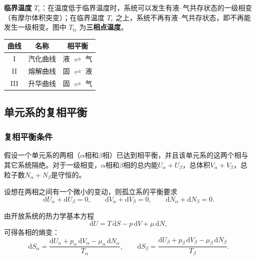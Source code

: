 \documentclass[UTF8]{ctexart}
\theoremstyle{definition}
\begin{document}
\textbf{临界温度} $T_c$：在温度低于临界温度时，系统可以发生有液--气共存状态的一级相变（有摩尔体积突变）；在临界温度 $T_c$ 之上，系统不再有液--气共存状态，即不再能发生一级相变。图中 $T_{\mathrm{tr}}$ 为\textbf{三相点温度}。

\begin{center}
\begin{tabular}{c|c|c}
\hline
曲线 & 名称 & 相平衡 \\
\hline
I & 汽化曲线 & 液 $\rightleftharpoons$ 气 \\
II & 熔解曲线 & 固 $\rightleftharpoons$ 液 \\
III & 升华曲线 & 固 $\rightleftharpoons$ 气 \\
\hline
\end{tabular}
\end{center}

\subsection{单元系的复相平衡}

\subsubsection*{复相平衡条件}

假设一个单元系的两相（$\alpha$相和$\beta$相）已达到相平衡，并且该单元系的这两个相与其它系统隔绝。对于一级相变，$\alpha$相和$\beta$相的总内能$U_\alpha+U_\beta$，总体积$V_\alpha+V_\beta$，总粒子数$N_\alpha+N_\beta$是守恒的。

设想在两相之间有一个微小的变动，则孤立系的平衡要求
\begin{equation}
\mathrm{d}U_\alpha+\mathrm{d}U_\beta=0,\qquad
\mathrm{d}V_\alpha+\mathrm{d}V_\beta=0,\qquad
\mathrm{d}N_\alpha+\mathrm{d}N_\beta=0.
\end{equation}

由开放系统的热力学基本方程
\begin{equation}
\mathrm{d}U = T\,\mathrm{d}S - p\,\mathrm{d}V + \mu\,\mathrm{d}N,
\end{equation}
可得各相的熵变：
\begin{equation}
\mathrm{d}S_\alpha = \frac{\mathrm{d}U_\alpha+p_\alpha\,\mathrm{d}V_\alpha-\mu_\alpha\,\mathrm{d}N_\alpha}{T_\alpha},
\qquad
\mathrm{d}S_\beta = \frac{\mathrm{d}U_\beta+p_\beta\,\mathrm{d}V_\beta-\mu_\beta\,\mathrm{d}N_\beta}{T_\beta}.
\end{equation}
\end{document}
